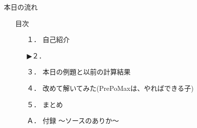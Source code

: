 \begin{frame}{本日の流れ}
  \begin{itemize}
      \item[] 目次
      \begin{itemize}[itemsep=1.3ex, leftmargin=1cm]
        \item[１．] 自己紹介
        \item[▶２．] 
        \item[３．] 本日の例題と以前の計算結果
        \item[４．] 改めて解いてみた(PrePoMaxは、やればできる子)
        \item[５．] まとめ
        \item[Ａ．] 付録 ～ソースのありか～
     \end{itemize}
  \end{itemize}
\end{frame}
